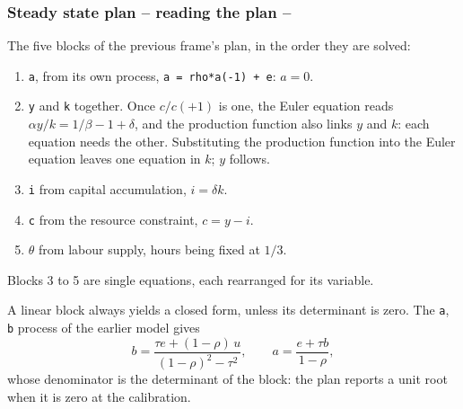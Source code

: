 \documentclass[10pt,slidestop]{beamer}
\theoremstyle{plain}
\begin{document}
\begin{frame}[fragile]
  \frametitle{Steady state plan -- reading the plan --}

  The five blocks of the previous frame's plan, in the order they are solved:
  \begin{enumerate}\small
  \item \verb+a+, from its own process, \verb|a = rho*a(-1) + e|: $a = 0$.
  \item \verb+y+ and \verb+k+ together. Once $c/c(+1)$ is one, the Euler equation
    reads $\alpha y/k = 1/\beta - 1 + \delta$, and the production function also
    links $y$ and $k$: each equation needs the other. Substituting the production
    function into the Euler equation leaves one equation in $k$; $y$ follows.
  \item \verb+i+ from capital accumulation, $i = \delta k$.
  \item \verb+c+ from the resource constraint, $c = y - i$.
  \item $\theta$ from labour supply, hours being fixed at $1/3$.
  \end{enumerate}
  \small Blocks 3 to 5 are single equations, each rearranged for its variable.

  \medskip
  A linear block always yields a closed form, unless its determinant is zero. The
  \verb+a+, \verb+b+ process of the earlier model gives
  \[
    b = \frac{\tau e + (1-\rho)\, u}{(1-\rho)^2 - \tau^2}, \qquad a = \frac{e + \tau b}{1-\rho},
  \]
  whose denominator is the determinant of the block: the plan reports a unit root
  when it is zero at the calibration.

\end{frame}
\end{document}
